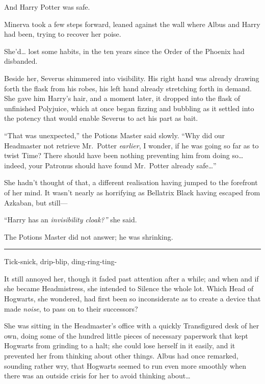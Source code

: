 And Harry Potter was safe.

Minerva took a few steps forward, leaned against the wall where Albus
and Harry had been, trying to recover her poise.

She'd\ldots{} lost some habits, in the ten years since the Order of the
Phoenix had disbanded.

Beside her, Severus shimmered into visibility. His right hand was
already drawing forth the flask from his robes, his left hand already
stretching forth in demand. She gave him Harry's hair, and a moment
later, it dropped into the flask of unfinished Polyjuice, which at once
began fizzing and bubbling as it settled into the potency that would
enable Severus to act his part as bait.

``That was unexpected,'' the Potions Master said slowly. ``Why did our
Headmaster not retrieve Mr.~Potter \emph{earlier}, I wonder, if he was
going so far as to twist Time? There should have been nothing preventing
him from doing so\ldots{} indeed, your Patronus should have found
Mr.~Potter already safe\ldots{}''

She hadn't thought of that, a different realisation having jumped to the
forefront of her mind. It wasn't nearly as horrifying as Bellatrix Black
having escaped from Azkaban, but still---

``Harry has an \emph{invisibility cloak?''} she said.

The Potions Master did not answer; he was shrinking.

\begin{center}\rule{3in}{0.4pt}\end{center}

Tick-snick, drip-blip, ding-ring-ting-

It still annoyed her, though it faded past attention after a while; and
when and if she became Headmistress, she intended to Silence the whole
lot. Which Head of Hogwarts, she wondered, had first been so
inconsiderate as to create a device that made \emph{noise}, to pass on
to their successors?

She was sitting in the Headmaster's office with a quickly Transfigured
desk of her own, doing some of the hundred little pieces of necessary
paperwork that kept Hogwarts from grinding to a halt; she could lose
herself in it easily, and it prevented her from thinking about other
things. Albus had once remarked, sounding rather wry, that Hogwarts
seemed to run even more smoothly when there was an outside crisis for
her to avoid thinking about\ldots{}

